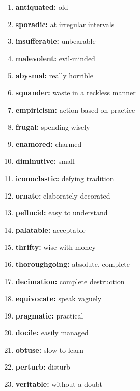 \documentclass{article}
\begin{document}
\begin{enumerate}
    \item \textbf{antiquated: }{old}
    \item \textbf{sporadic: }{at irregular intervals}
    \item \textbf{insufferable: }{unbearable}
    \item \textbf{malevolent: }{evil-minded}
    \item \textbf{abysmal: }{really horrible}
    \item \textbf{squander: }{waste in a reckless manner}
    \item \textbf{empiricism: }{action based on practice}
    \item \textbf{frugal: }{spending wisely}
    \item \textbf{enamored: }{charmed}
    \item \textbf{diminutive: }{small}
    \item \textbf{iconoclastic: }{defying tradition}
    \item \textbf{ornate: }{elaborately decorated}
    \item \textbf{pellucid: }{easy to understand}
    \item \textbf{palatable: }{acceptable}
    \item \textbf{thrifty: }{wise with money}
    \item \textbf{thoroughgoing: }{absolute, complete}
    \item \textbf{decimation: }{complete destruction}
    \item \textbf{equivocate: }{speak vaguely}
    \item \textbf{pragmatic: }{practical}
    \item \textbf{docile: }{easily managed}
    \item \textbf{obtuse: }{slow to learn}
    \item \textbf{perturb: }{disturb}
    \item \textbf{veritable: }{without a doubt}
    
\end{enumerate}
\end{document}
